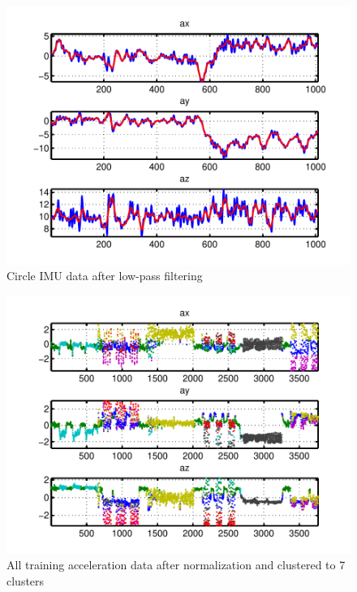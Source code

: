 \documentclass[twoside]{article}
\begin{document}
\begin{multicols}{2}
\begin{figure}[H]
\centering
\includegraphics[width=\columnwidth]{fig/filter.pdf} 
\caption{Circle IMU data after low-pass filtering}
\label{fig:imu_filt}
\end{figure}

\begin{figure}[H]
\centering
\includegraphics[width=\columnwidth]{fig/cluster.pdf} 
\caption{All training acceleration data after normalization and clustered to 7 clusters}
\label{fig:imu_cluster}
\end{figure}



\end{multicols}
\end{document}
